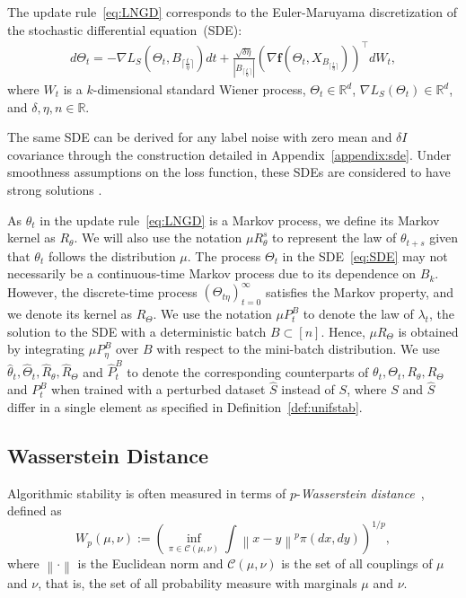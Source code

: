 \documentclass{article}
\newcommand{\norm}[1]{\left\lVert#1\right\rVert} %
\begin{document}
The update rule~\eqref{eq:LNGD} corresponds to the Euler-Maruyama discretization of the stochastic differential equation~(SDE):
\begin{align}\label{eq:SDE}
    d\Theta_t  = - \nabla L_S(\Theta_t, B_{\lceil \frac{t}{\eta} \rceil} ) dt + \frac{\sqrt{\delta \eta}}{|B_{\lceil \frac{t}{\eta} \rceil}|}\! \left( \nabla \textbf{f}(\Theta_t, X_{B_{\lceil \frac{t}{\eta} \rceil}})\right)^\top dW_t,
\end{align}
where $W_t$ is a $k$-dimensional standard Wiener process, $\Theta_t \in \mathbb{R}^d$, $\nabla L_S(\Theta_t) \in \mathbb{R}^d$, and $\delta, \eta, n \in \mathbb{R}$.

The same SDE can be derived for any label noise with zero mean and $\delta I$ covariance through the construction detailed in Appendix~\ref{appendix:sde}. Under smoothness assumptions on the loss function, these SDEs are considered to have strong solutions \citep[Theorem 3.1]{Oksendal}.

As $\theta_t$ in the update rule~\eqref{eq:LNGD} is a Markov process, we define its Markov kernel as $R_\theta$. We will also use the notation $\mu R_\theta^s$ to represent the law of $\theta_{t+s}$ given that $\theta_t$ follows the distribution $\mu$. The process $\Theta_t$ in the SDE~\eqref{eq:SDE} may not necessarily be a continuous-time Markov process due to its dependence on $B_k$. However, the discrete-time process $(\Theta_{t\eta})_{t=0}^\infty$ satisfies the Markov property, and we denote its kernel as $R_\Theta$. We use the notation $\mu P_t^B$ to denote the law of $\lambda_t$, the solution to the SDE with a deterministic batch $B \subset [n]$. Hence, $\mu R_\Theta$ is obtained by integrating $\mu P_\eta^B$ over $B$ with respect to the mini-batch distribution. We use $\widehat{\theta}_t, \widehat{\Theta}_t, \widehat{R}_\theta, \widehat{R}_\Theta$ and $\widehat{P}_t^B$ to denote the corresponding counterparts of $\theta_t, \Theta_t, R_\theta, R_\Theta$ and $P_t^B$ when trained with a perturbed dataset $\widehat{S}$ instead of $S$, where $S$ and $\widehat{S}$ differ in a single element as specified in Definition~\ref{def:unifstab}.

\subsection{Wasserstein Distance}\label{sec:tech}
Algorithmic stability is often measured in terms of $p$-\textit{Wasserstein distance}~\citep{Raginsky, Farghly}, defined as $$W_p (\mu, \nu) := \left(\inf_{\pi \in \mathcal{C}(\mu, \nu)} \int \norm{x-y}^p \pi (dx, dy) \right)^{1/p},$$
where $\norm{\cdot}$ is the Euclidean norm and $\mathcal{C}(\mu, \nu)$ is the set of all couplings of $\mu$ and $\nu$, that is, the set of all probability measure with marginals $\mu$ and $\nu$.
\end{document}
